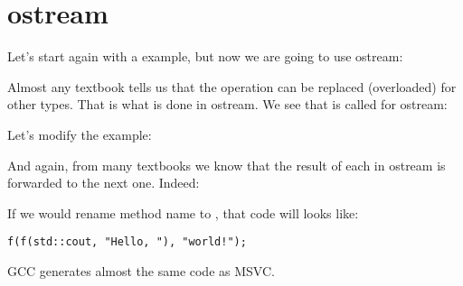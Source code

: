 \section{ostream}

Let's start again with a  example, but now we are going to use ostream:



Almost any \Cpp textbook tells us that the \TT{<<} operation can be replaced (overloaded) for other types.
That is what is done in ostream.
We see that  is called for ostream:



Let's modify the example:



And again, from many \Cpp textbooks we know that the result of each  in ostream is forwarded to the
next one.
Indeed:



If we would rename  method name to \ttf{}, that code will looks like:

\begin{lstlisting}
f(f(std::cout, "Hello, "), "world!");
\end{lstlisting}

GCC generates almost the same code as MSVC.


